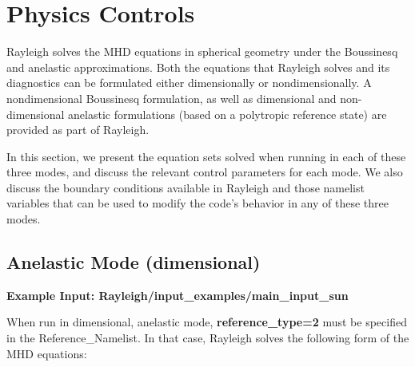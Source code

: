 \clearpage
\section{Physics Controls}\label{sec:physics}
Rayleigh solves the MHD equations in spherical geometry under the Boussinesq and anelastic approximations.  Both the equations that Rayleigh solves and its diagnostics can be formulated either dimensionally or nondimensionally.  A nondimensional Boussinesq formulation, as well as dimensional and non-dimensional anelastic formulations (based on a polytropic reference state) are provided as part of Rayleigh.

In this section, we present the equation sets solved when running in each of these three modes, and discuss the relevant control parameters for each mode.   We also discuss the boundary conditions available in Rayleigh and those namelist variables that can be used to modify the code's behavior in any of these three modes.

\subsection{Anelastic Mode (dimensional)}

\textbf{Example Input:  Rayleigh/input\_examples/main\_input\_sun}

When run in dimensional, anelastic mode, \textbf{reference\_type=2} must be specified in the Reference\_Namelist.  In that case, Rayleigh solves the following form of the MHD equations:



